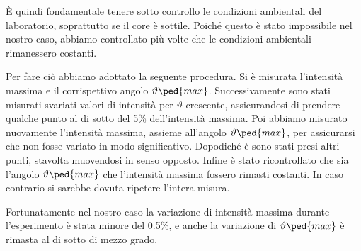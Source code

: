 È quindi fondamentale tenere sotto controllo le condizioni ambientali del laboratorio, soprattutto se il core è sottile. Poiché
questo è stato impossibile nel nostro caso, abbiamo controllato più volte che le condizioni ambientali rimanessero costanti.

Per fare ciò abbiamo adottato la seguente procedura. Si è misurata l'intensità massima e il corrispettivo angolo $\vartheta\ped{max}$.
Successivamente sono stati misurati svariati valori di intensità per $\vartheta$ crescente, assicurandosi di prendere qualche punto
al di sotto del 5\% dell'intensità massima. Poi abbiamo misurato nuovamente l'intensità massima, assieme all'angolo $\vartheta\ped{max}$,
per assicurarsi che non fosse variato in modo significativo. Dopodiché è sono stati presi altri punti, stavolta muovendosi in senso opposto.
Infine è stato ricontrollato che sia l'angolo $\vartheta\ped{max}$ che l'intensità massima fossero rimasti costanti. In caso
contrario si sarebbe dovuta ripetere l'intera misura.

Fortunatamente nel nostro caso la variazione di intensità massima durante l'esperimento è stata minore del 0.5\%, e anche la variazione
di $\vartheta\ped{max}$ è rimasta al di sotto di mezzo grado. 
